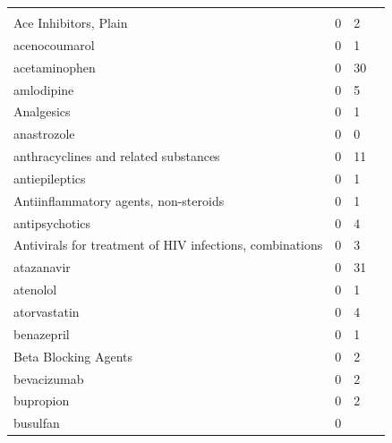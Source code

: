 \documentclass{book}
\begin{document}
\begin{tabularx}{1.3\textwidth}{XXXX}
\hline \\Ace Inhibitors, Plain &  0 & 2 \\acenocoumarol &  0 & 1 \\acetaminophen &  0 & 30 \\amlodipine &  0 & 5 \\Analgesics &  0 & 1 \\anastrozole &  0 & 0 \\anthracyclines and related substances &  0 & 11 \\antiepileptics &  0 & 1 \\Antiinflammatory agents, non-steroids &  0 & 1 \\antipsychotics &  0 & 4 \\Antivirals for treatment of HIV infections, combinations &  0 & 3 \\atazanavir &  0 & 31 \\atenolol &  0 & 1 \\atorvastatin &  0 & 4 \\benazepril &  0 & 1 \\Beta Blocking Agents &  0 & 2 \\bevacizumab &  0 & 2 \\bupropion &  0 & 2 \\busulfan &  0 
\end{tabularx}
\end{document}
